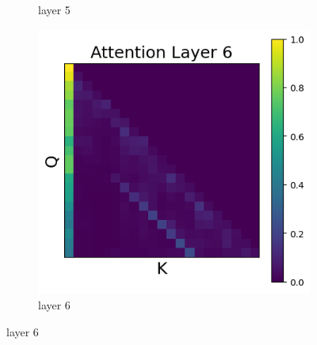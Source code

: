 \documentclass[11pt]{article}
\begin{document}
\begin{figure}[t]
\begin{subfigure}[t]{0.24\textwidth}
    \caption{layer 5}
  \end{subfigure}\hfill
  \begin{subfigure}[t]{0.24\textwidth}
    \centering
    \includegraphics[width=1.4\columnwidth]{figures/intervention5_2/layer_6.png}
    \caption{layer 6}
  \end{subfigure}\hfill


\end{figure}
\end{document}
